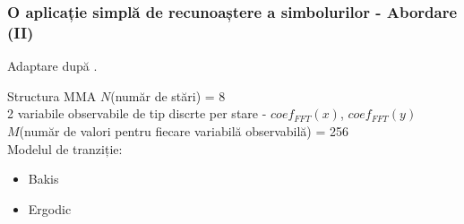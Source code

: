 \begin{frame}
	\frametitle{O aplicație simplă de recunoaștere a simbolurilor - Abordare (II)}
	Adaptare după \citep{yang1994hidden}.
	
	\begin{block}{Structura MMA}
		$N$(număr de stări) = 8\\
		2 variabile observabile de tip discrte per stare - $coef_{FFT}(x)$, $coef_{FFT}(y)$\\
		$M$(număr de valori pentru fiecare variabilă observabilă) = 256\\
		Modelul de tranziție:\\
		\begin{itemize}
			\item Bakis
			\item Ergodic
		\end{itemize}
	\end{block}
\end{frame}


